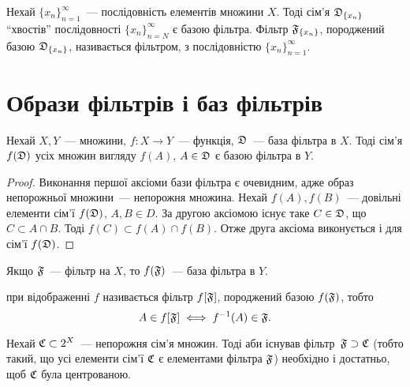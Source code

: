 \begin{definition}
    Нехай $\{x_n\}_{n = 1}^\infty$~--- послідовність елементів множини $X$. Тоді сім'я $\frak D_{\{x_n\}}$ ``хвостів'' послідовності $\{x_n\}_{n = N}^\infty$ є базою фільтра. Фільтр $\frak F_{\{x_n\}}$, породжений базою $\frak D_{\{x_n\}}$, називається фільтром,  з послідовністю $\{x_n\}_{n = 1}^\infty$.
\end{definition}

\section{Образи фільтрів і баз фільтрів}

\begin{theorem}
    \label{th:filterbase-image-filterbase}
    Нехай $X, Y$~--- множини, $f: X \to Y$~--- функція, $\frak D$~--- база фільтра в $X$. Тоді сім'я $f(\frak D)$ усіх множин вигляду $f(A)$, $A \in \frak D$ є базою фільтра в $Y$.
\end{theorem}

\begin{proof}
    Виконання першої аксіоми бази фільтра є очевидним, адже образ непорожньої множини~--- непорожня множина. Нехай $f(A), f(B)$~--- довільні елементи сім'ї $f(\frak D)$, $A, B \in D$. За другою аксіомою існує таке $C \in \frak D$, що $C \subset A \cap B$. Тоді $f(C) \subset f(A) \cap f(B)$. Отже друга аксіома виконується і для сім'ї $f(\frak D)$.
\end{proof}

\begin{corollary}
    \label{th:filter-image-filterbase}
    Якщо $\frak F$~--- фільтр на $X$, то $f(\frak F)$~--- база фільтра в $Y$.
\end{corollary}

\begin{definition}
     при відображенні $f$ називається фільтр $f[\frak F]$, породжений базою $f(\frak F)$, тобто
    \begin{equation*}
        A \in f[\frak F] \iff f\inv (A) \in \frak F.
    \end{equation*}
\end{definition}

\begin{theorem}
    \label{th:supset-finite-intersection-property}
    Нехай $\frak C \subset 2^X$~--- непорожня сім'я множин. Тоді аби існував фільтр~$\frak F \supset \frak C$ (тобто такий, що усі елементи сім'ї $\frak C$ є елементами фільтра $\frak F$) необхідно і достатньо, щоб $\frak C$ була центрованою.
\end{theorem}

